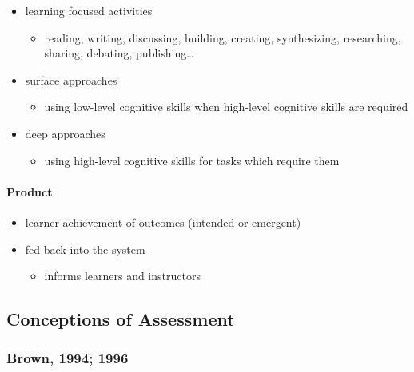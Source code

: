 \documentclass[
]{book}
\providecommand{\tightlist}{%
  \setlength{\itemsep}{0pt}\setlength{\parskip}{0pt}}
\begin{document}
\begin{itemize}
\tightlist
\item
  learning focused activities

  \begin{itemize}
  \tightlist
  \item
    reading, writing, discussing, building, creating, synthesizing, researching, sharing, debating, publishing\ldots{}
  \end{itemize}
\item
  surface approaches

  \begin{itemize}
  \tightlist
  \item
    using low-level cognitive skills when high-level cognitive skills are required
  \end{itemize}
\item
  deep approaches

  \begin{itemize}
  \tightlist
  \item
    using high-level cognitive skills for tasks which require them
  \end{itemize}
\end{itemize}

\hypertarget{product}{%
\paragraph*{Product}\label{product}}

\begin{itemize}
\tightlist
\item
  learner achievement of outcomes (intended or emergent)
\item
  fed back into the system

  \begin{itemize}
  \tightlist
  \item
    informs learners and instructors
  \end{itemize}
\end{itemize}

\hypertarget{conceptions-of-assessment}{%
\subsection*{Conceptions of Assessment}\label{conceptions-of-assessment}}

\hypertarget{brown-1994-1996}{%
\subsubsection*{Brown, 1994; 1996}\label{brown-1994-1996}}
\end{document}
